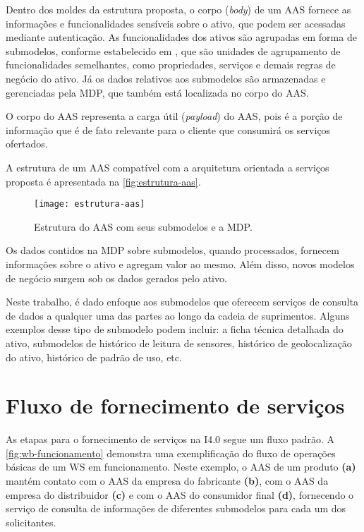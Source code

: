 	Dentro dos moldes da estrutura proposta, o corpo (\textit{body}) de um AAS fornece as informações e funcionalidades sensíveis sobre o ativo, que podem ser acessadas mediante autenticação. As funcionalidades dos ativos são agrupadas em forma de submodelos, conforme estabelecido em , que são unidades de agrupamento de funcionalidades semelhantes, como propriedades, serviços e demais regras de negócio do ativo. Já os dados relativos aos submodelos são armazenadas e gerenciadas pela MDP, que também está localizada no corpo do AAS.
	
	O corpo do AAS representa a carga útil (\textit{payload}) do AAS, pois é a porção de informação que é de fato relevante para o cliente que consumirá os serviços ofertados.
	
	A estrutura de um AAS compatível com a arquitetura orientada a serviços proposta é apresentada na \autoref{fig:estrutura-aas}.
	
	\begin{figure}[htb]
		\centering
		\caption{Estrutura do AAS com seus submodelos e a MDP.}
		\label{fig:estrutura-aas}
		\texttt{[image: estrutura-aas]}
	\end{figure}

	Os dados contidos na MDP sobre submodelos, quando processados, fornecem informações sobre o ativo e agregam valor ao mesmo. Além disso, novos modelos de negócio surgem sob os dados gerados pelo ativo.
	
	Neste trabalho, é dado enfoque aos submodelos que oferecem serviços de consulta de dados a qualquer uma das partes ao longo da cadeia de suprimentos. Alguns exemplos desse tipo de submodelo podem incluir: a ficha técnica detalhada do ativo, submodelos de histórico de leitura de sensores, histórico de geolocalização do ativo, histórico de padrão de uso, etc.


\section{Fluxo de fornecimento de serviços}

	As etapas para o fornecimento de serviços na I4.0 segue um fluxo padrão. A \autoref{fig:wb-funcionamento} demonstra uma exemplificação do fluxo de operações básicas de um WS em funcionamento. Neste exemplo, o AAS de um produto \textbf{(a)} mantém contato com o AAS da empresa do fabricante \textbf{(b)}, com o AAS da empresa do distribuidor \textbf{(c)} e com o AAS do consumidor final \textbf{(d)}, fornecendo o serviço de consulta de informações de diferentes submodelos para cada um dos solicitantes. 	
	

